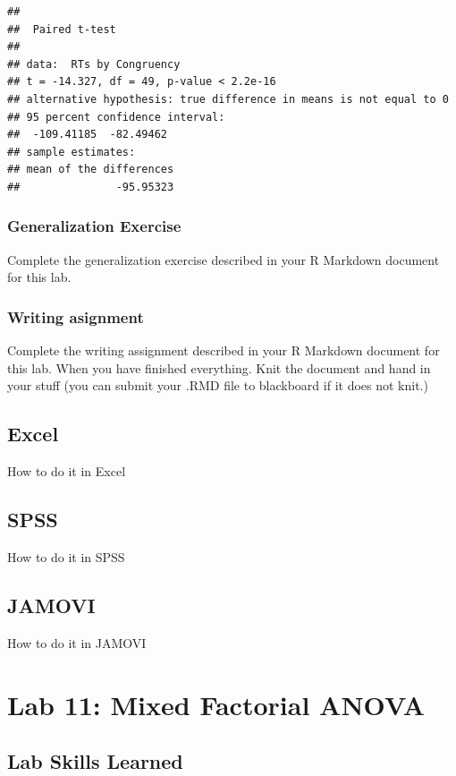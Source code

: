 \documentclass[]{book}
\theoremstyle{definition}
\theoremstyle{definition}
\theoremstyle{definition}
\theoremstyle{remark}
\begin{document}
\begin{verbatim}
## 
##  Paired t-test
## 
## data:  RTs by Congruency
## t = -14.327, df = 49, p-value < 2.2e-16
## alternative hypothesis: true difference in means is not equal to 0
## 95 percent confidence interval:
##  -109.41185  -82.49462
## sample estimates:
## mean of the differences 
##               -95.95323
\end{verbatim}

\subsection{Generalization Exercise}\label{generalization-exercise-7}

Complete the generalization exercise described in your R Markdown
document for this lab.

\subsection{Writing asignment}\label{writing-asignment-7}

Complete the writing assignment described in your R Markdown document
for this lab. When you have finished everything. Knit the document and
hand in your stuff (you can submit your .RMD file to blackboard if it
does not knit.)

\section{Excel}\label{excel-9}

How to do it in Excel

\section{SPSS}\label{spss-9}

How to do it in SPSS

\section{JAMOVI}\label{jamovi-9}

How to do it in JAMOVI

\chapter{Lab 11: Mixed Factorial
ANOVA}\label{lab-11-mixed-factorial-anova}

\section{Lab Skills Learned}\label{lab-skills-learned-5}
\end{document}
